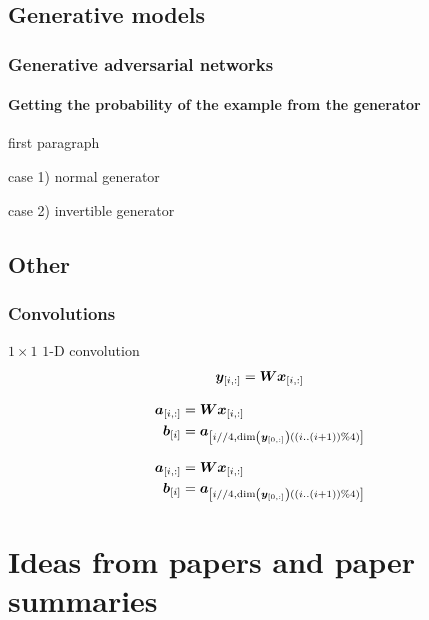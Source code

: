 \documentclass[oneside]{book}
\begin{document}
\chapter{Generative models}



\section{Generative adversarial networks}

\subsection{Getting the probability of the example from the generator}

first paragraph

case 1) normal generator

case 2) invertible generator



\chapter{Other}

\section{Convolutions}


$1\times1$ $1$-D convolution
\begin{align}
\vec y_\ind{i,:} = \vec W\vec x_\ind{i, :}
\end{align}

\begin{align}
\vec a_\ind{i,:} &= \vec W\vec x_\ind{i, :} \\
\vec b_\ind{i} &= \vec a_\ind{i//4, \dim\del{\vec y_\ind{0,:}}\del{\del{i..(i+1)}\% 4}}
\end{align}

\begin{align}
\vec a_\ind{i,:} &= \vec W\vec x_\ind{i, :} \\
\vec b_\ind{i} &= \vec a_\ind{i//4, \dim\del{\vec y_\ind{0,:}}\del{\del{i..(i+1)}\% 4}}
\end{align}



\part{Ideas from papers and paper summaries}
\end{document}
